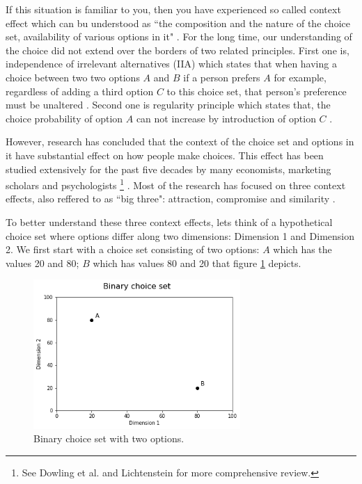 \documentclass[a4paper,12pt]{article}
\newcommand{\citeyearonly}[1]{\citeyearpar{#1}}
\begin{document}
If this situation is familiar to you, then you have experienced so called context effect which can bu understood as ``the composition  and the nature of the choice set, availability of various options in it" \citep{tversky1972elimination, huberPuto83}. For the long time, our understanding of the choice did not extend over the borders of two related principles. First one is, independence of irrelevant alternatives (IIA) which states that when having a choice between two two options $A$ and $B$ if a person prefers $A$ for example, regardless of adding a third option $C$ to this choice set, that person's preference must be unaltered \citep{luce59}. Second one is regularity principle which states that, the choice probability of option $A$ can not increase by introduction of option $C$ \citep{luce59}.

However, research has concluded that the context of the choice set and options in it have substantial effect on how people make choices. This effect has been studied extensively for the past five decades by many economists, marketing scholars and psychologists \footnote{See Dowling et al. \citeyearonly{dowlingEtAl20} and Lichtenstein \citeyearonly{lichtenstein2006construction} for more comprehensive review.} \citep{ kahnemanTversky79, simonson89, tverskySimonson93, lichtenstein2006construction, dowlingEtAl20}. Most of the research has focused on three context effects, also reffered to as ``big three": attraction, compromise and similarity \citep{howes2016contextual}.

To better understand these three context effects, lets think of a hypothetical choice set where options differ along two dimensions: Dimension 1 and Dimension 2. We first start with a choice set consisting of two options: $A$ which has the values 20 and 80; $B$ which has values 80 and 20 that figure \ref{fig:binaryChoiseSet} depicts. 

\begin{figure}[h]
    \centering
    \includegraphics[width=0.7\textwidth]{staticFiles/noEffect.png}
    \caption{Binary choice set with two options.} %
    \label{fig:binaryChoiseSet} %

\end{figure}
\end{document}
